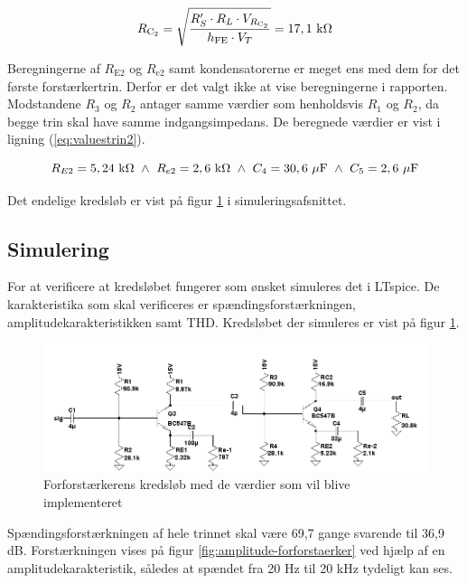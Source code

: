 \begin{equation}
R_{\mathrm{C_2}} = \sqrt{\frac{R'_S \cdot R_L \cdot V_{R_\mathrm{C_2}}}{h_\mathrm{FE} \cdot V_T}} = 17,1~\mathrm{k}\ohm
\label{eq:rc2maks}
\end{equation}

Beregningerne af $R_{\mathrm{E2}}$ og $R_{\mathrm{e2}}$ samt kondensatorerne er meget ens med dem for det første forstærkertrin. Derfor er det valgt ikke at vise beregningerne i rapporten. Modstandene $R_3$ og $R_2$ antager samme værdier som henholdsvis $R_1$ og $R_2$, da begge trin skal have samme indgangsimpedans. De beregnede værdier er vist i ligning (\ref{eq:valuestrin2}).

\begin{equation}
R_{E2}=5,24~\mathrm{k\ohm} ~ \wedge ~R_{e2}=2,6~\mathrm{k\ohm} ~ \wedge ~ C_4=30,6~\mathrm{\mu F} ~ \wedge ~ C_5=2,6~\mathrm{\mu F}
\label{eq:valuestrin2}
\end{equation}

Det endelige kredsløb er vist på figur \ref{fig:forforstaerkersimuleringkredslob} i simuleringsafsnittet.

\subsection*{Simulering}

For at verificere at kredsløbet fungerer som ønsket simuleres det i LTspice. De karakteristika som skal verificeres er spændingsforstærkningen, amplitudekarakteristikken samt THD. Kredsløbet der simuleres er vist på figur \ref{fig:forforstaerkersimuleringkredslob}. 

\begin{figure}[h]
\centering
\includegraphics[width=\textwidth]{teknisk/forforstaerker/forforstaerkerendeligkreds.png}
\caption{Forforstærkerens kredsløb med de værdier som vil blive implementeret}
\label{fig:forforstaerkersimuleringkredslob}
\end{figure}

Spændingsforstærkningen af hele trinnet skal være 69,7 gange svarende til 36,9 dB. Forstærkningen vises på figur \ref{fig:amplitude-forforstaerker} ved hjælp af en amplitudekarakteristik, således at spændet fra 20 Hz til 20 kHz tydeligt kan ses. 


